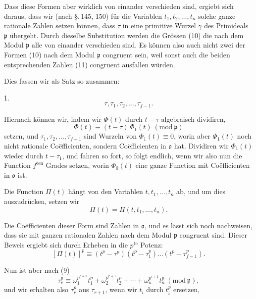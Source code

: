 Dass diese Formen aber wirklich von einander verschieden sind,
ergiebt sich daraus, dass wir (nach \S.\,145, 150) für die Variablen
$t_1, t_2, \ldots, t_n$ solche ganze rationale Zahlen setzen können,
dass $\tau$ in eine primitive Wurzel $\gamma$ des Primideals
$\mathfrak p$ übergeht. Durch dieselbe Substitution werden die
Grössen (10)
die nach dem Modul $\mathfrak p$ alle von einander verschieden sind.
Es können also auch nicht zwei der Formen (10) nach dem Modul
$\mathfrak p$ congruent sein, weil sonst auch die beiden
entsprechenden Zahlen (11) congruent ausfallen würden.

Dies fassen wir als Satz so zusammen:

1. 
\[
\tau, \tau_1, \tau_2, \ldots, \tau_{f-1}.
\]

Hiernach können wir, indem wir $\Phi(t)$ durch $t - \tau$ algebraisch
dividiren,
\[
\Phi(t) \equiv (t - \tau)\, \Phi_1(t)\ (\mathrm{mod}\ \mathfrak p)
\]
setzen, und $\tau_1, \tau_2, \ldots, \tau_{f-1}$ sind Wurzeln von
$\Phi_1(t) \equiv 0$, worin aber $\Phi_1(t)$ noch nicht rationale
Coëfficienten, sondern Coëfficienten in $\mathfrak o$ hat. Dividiren
wir $\Phi_1(t)$ wieder durch $t - \tau_1$, und fahren so fort, so
folgt endlich, wenn wir also nun die Function $f^{\text{ten}}$ Grades
setzen,
worin $\Phi_0(t)$ eine ganze Function mit Coëfficienten in
$\mathfrak o$ ist.

Die Function $\Pi(t)$ hängt von den Variablen $t, t_1, \ldots, t_n$
ab, und um dies auszudrücken, setzen wir
\[
\Pi(t) = \Pi(t, t_1, \ldots, t_n).
\]

Die Coëfficienten dieser Form sind Zahlen in $\mathfrak o$, und es
lässt sich noch nachweisen, dass sie mit ganzen rationalen Zahlen
nach dem Modul $\mathfrak p$ congruent sind. Dieser Beweis ergiebt
sich durch Erheben in die $p^{\text{te}}$ Potenz:
\[
[\Pi(t)]^p \equiv (t^p - \tau^p)(t^p - \tau_1^p) \ldots (t^p - \tau_{f-1}^p).
\]

Nun ist aber nach (9)
\[
\tau_r^p \equiv \omega_1^{p^{r+1}} t_1^p + \omega_2^{p^{r+1}} t_2^p + \cdots + \omega_n^{p^{r+1}} t_n^p\ (\mathrm{mod}\ \mathfrak p),
\]
und wir erhalten also $\tau_r^p$ aus $\tau_{r+1}$, wenn wir $t_i$
durch $t_i^p$ ersetzen,
